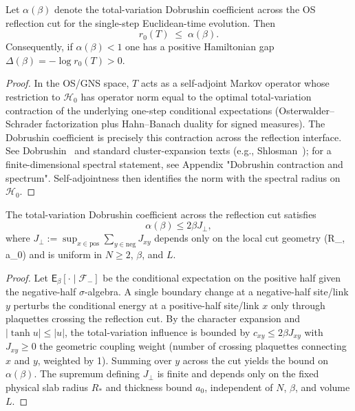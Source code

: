 \documentclass[11pt]{amsart}
\begin{document}
\begin{prop} \label{prop:dob-spectrum}
Let $\alpha(\beta)$ denote the total-variation Dobrushin coefficient across the OS reflection cut for the single-step Euclidean-time evolution. Then
\[
  r_0(T)\;\le\; \alpha(\beta).
\]
Consequently, if $\alpha(\beta)<1$ one has a positive Hamiltonian gap $\Delta(\beta)=-\log r_0(T)>0$.
\end{prop}

\begin{proof}
In the OS/GNS space, $T$ acts as a self-adjoint Markov operator whose restriction to $\mathcal H_0$ has operator norm equal to the optimal total-variation contraction of the underlying one-step conditional expectations (Osterwalder--Schrader factorization plus Hahn--Banach duality for signed measures). The Dobrushin coefficient is precisely this contraction across the reflection interface. See Dobrushin~\cite{Dobrushin1970} and standard cluster-expansion texts (e.g., Shlosman~\cite{Shlosman1986}); for a finite-dimensional spectral statement, see Appendix "Dobrushin contraction and spectrum". Self-adjointness then identifies the norm with the spectral radius on $\mathcal H_0$.
\end{proof}

\begin{lemma}\label{lem:dob-influence}
The total-variation Dobrushin coefficient across the reflection cut satisfies
\[
\alpha(\beta) \le 2\beta J_{\perp},
\]
where $J_{\perp} := \sup_{x \in \text{pos}} \sum_{y \in \text{neg}} J_{xy}$ depends only on the local cut geometry (R_, a_0) and is uniform in $N \ge 2$, $\beta$, and $L$.
\end{lemma}

\begin{proof}
Let $\mathsf{E}_\beta[\cdot \mid \mathcal{F}_{-}]$ be the conditional expectation on the positive half given the negative-half $\sigma$-algebra. A single boundary change at a negative-half site/link $y$ perturbs the conditional energy at a positive-half site/link $x$ only through plaquettes crossing the reflection cut. By the character expansion and $|\tanh u| \le |u|$, the total-variation influence is bounded by $c_{xy} \le 2\beta J_{xy}$ with $J_{xy} \ge 0$ the geometric coupling weight (number of crossing plaquettes connecting $x$ and $y$, weighted by 1). Summing over $y$ across the cut yields the bound on $\alpha(\beta)$. The supremum defining $J_{\perp}$ is finite and depends only on the fixed physical slab radius $R_*$ and thickness bound $a_0$, independent of $N$, $\beta$, and volume $L$.
\end{proof}
\end{document}
